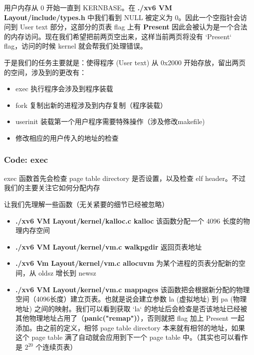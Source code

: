 用户内存从 0 开始一直到 KERNBASE。在 \textbf{./xv6 VM Layout/include/types.h} 中我们看到 NULL 被定义为 0。因此一个空指针会访问到 User text 部分，这部分的页表 flag 上有 \textbf{Present} 因此会被认为是一个合法的内存访问。现在我们希望把前两页空出来，这样当前两页将没有 `Present` flag，访问的时候 kernel 就会帮我们处理错误。

于是我们的任务主要就是：使得程序 (User text) 从 0x2000 开始存放，留出两页的空间，涉及到的更改有：

\begin{itemize}
    \item exec 执行程序会涉及到程序装载
    \item fork 复制出新的进程涉及到内存复制（程序装载）
    \item userinit 装载第一个用户程序需要特殊操作（涉及修改makefile)
    \item 修改相应的用户传入的地址的检查
\end{itemize}


\subsubsection{Code: exec}

exec 函数首先会检查 page table directory 是否设置，以及检查 elf header。不过我们的主要关注它如何分配内存

让我们先理解一些函数（无关紧要的细节已经被忽略）

\begin{itemize}
    \item \textbf{./xv6 VM Layout/kernel/kalloc.c kalloc} 该函数分配一个 4096 长度的物理内存空间
    \item \textbf{./xv6 VM Layout/kernel/vm.c walkpgdir} 返回页表地址
    \item \textbf{./xv6 Vm Layout/kernel/vm.c allocuvm} 为某个进程的页表分配新的空间，从 oldsz 增长到 newsz
    \item \textbf{./xv6 VM Layout/kernel/vm.c mappages} 该函数把会根据新分配的物理空间（4096长度）建立页表。也就是说会建立参数 la (虚拟地址) 到 pa (物理地址) 之间的映射。我们可以看到获取 `la` 的地址后会检查是否该地址已经被其他物理地址占用了（\textbf{panic("remap")}），否则就把 flag 加上 Present 一起添加。由之前的定义，相邻 page table directory 本来就有相邻的地址，如果这个 page table 满了自动就会应用到下一个 page table 中。（其实也可以看作是 $2^{20}$ 个连续页表）
\end{itemize}







